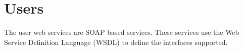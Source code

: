 \documentclass[letterpaper,10pt,english]{sphinxmanual}
\begin{document}
\section{Users}
\label{\detokenize{soapapi:users}}
The user web services are SOAP based services. These services use the Web Service Definition Language (WSDL) to define the interfaces supported.


\begin{sphinxVerbatim}[commandchars=\\\{\}]
\end{sphinxVerbatim}

\end{document}
